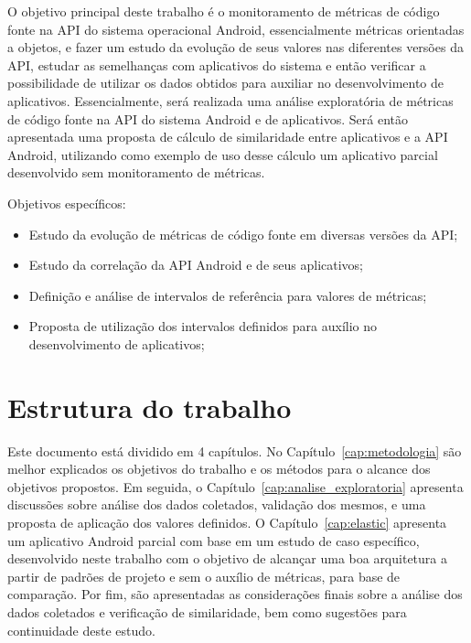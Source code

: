 O objetivo principal deste trabalho é o monitoramento de métricas de código fonte na API do sistema operacional Android, essencialmente métricas orientadas a objetos, e fazer um estudo da evolução de seus valores nas diferentes versões da API, estudar as semelhanças com aplicativos do sistema e então verificar a possibilidade de utilizar os dados obtidos para auxiliar no desenvolvimento de aplicativos. Essencialmente, será realizada uma análise exploratória de métricas de código fonte na API do sistema Android e de aplicativos. Será então apresentada uma proposta de cálculo de similaridade entre aplicativos e a API Android, utilizando como exemplo de uso desse cálculo um aplicativo parcial desenvolvido sem monitoramento de métricas.

Objetivos específicos:
\begin{itemize}
\item Estudo da evolução de métricas de código fonte em diversas versões da API;
\item Estudo da correlação da API Android e de seus aplicativos;
\item Definição e análise de intervalos de referência para valores de métricas;
\item Proposta de utilização dos intervalos definidos para auxílio no desenvolvimento de aplicativos;
\end{itemize}

\section{Estrutura do trabalho}

Este documento está dividido em 4 capítulos. No Capítulo~\ref{cap:metodologia} são melhor explicados os objetivos do trabalho e os métodos para o alcance dos objetivos propostos. Em seguida, o Capítulo~\ref{cap:analise_exploratoria} apresenta discussões sobre análise dos dados coletados, validação dos mesmos, e uma proposta de aplicação dos valores definidos. O Capítulo~\ref{cap:elastic} apresenta um aplicativo Android parcial com base em um estudo de caso específico, desenvolvido neste trabalho com o objetivo de alcançar uma boa arquitetura a partir de padrões de projeto e sem o auxílio de métricas, para base de comparação. Por fim, são apresentadas as considerações finais sobre a análise dos dados coletados e verificação de similaridade, bem como sugestões para continuidade deste estudo.